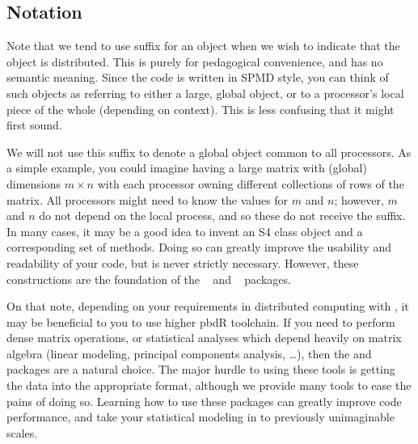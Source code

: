 \subsection[Notation]{Notation}
\label{sec:notation}

Note that we tend to use suffix  for an object when we wish to indicate that the object is distributed.  This is purely for pedagogical convenience, and has no semantic meaning.  Since the code is written in SPMD style, you can think of such objects as referring to either a large, global object, or to a processor's local piece of the whole (depending on context).  This is less confusing that it might first sound.


We will not use this suffix to denote a global object common to all processors.  As a simple example, you could imagine having a large matrix with (global) dimensions $m\times n$ with each processor owning different collections of rows of the matrix.  All processors might need to know the values for $m$ and $n$; however, $m$ and $n$ do not depend on the local process, and so these do not receive the  suffix.  In many cases, it may be a good idea to invent an S4 class object and a corresponding set of methods.  Doing so can greatly improve the usability and readability of your code, but is never strictly necessary.  However, these constructions are the foundation of the ~\citep{Schmidt2012pbdBASEpackage} and
~\citep{Schmidt2012pbdDMATpackage} packages.

On that note, depending on your requirements in distributed computing with , it may be beneficial to you to use higher pbdR toolchain.  If you need to perform dense matrix operations, or statistical analyses which depend heavily on matrix algebra (linear modeling, principal components analysis, \dots), then the  and  packages are a natural choice.  The major hurdle to using these tools is getting the data into the appropriate  format, although we provide many tools to ease the pains of doing so.  Learning how to use these packages can greatly improve code performance, and take your statistical modeling in  to previously unimaginable scales.

